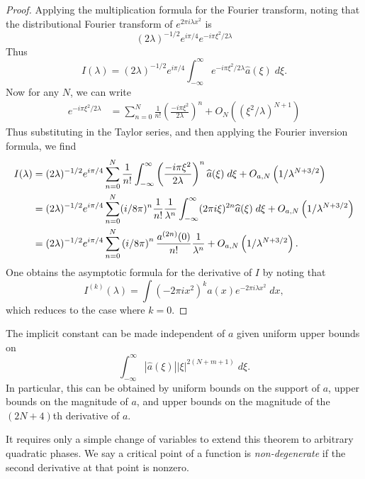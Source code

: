 \begin{proof}
  Applying the multiplication formula for the Fourier transform, noting that the distributional Fourier transform of $e^{2 \pi i \lambda x^2}$ is
  \[ (2 \lambda)^{-1/2} e^{i \pi / 4} e^{- i \pi \xi^2 / 2 \lambda} \]
  Thus
  \[ I(\lambda) = (2 \lambda)^{-1/2} e^{i \pi / 4} \int_{-\infty}^\infty e^{-i \pi \xi^2 / 2 \lambda} \widehat{a}(\xi)\; d\xi. \]
  Now for any $N$, we can write
  \begin{align*}
    e^{-i \pi \xi^2 / 2 \lambda} &= \sum_{n = 0}^N \frac{1}{n!} \left( \frac{- i \pi \xi^2}{2 \lambda} \right)^n + O_N \left( (\xi^2 / \lambda)^{N+1} \right)
  \end{align*}
  Thus substituting in the Taylor series, and then applying the Fourier inversion formula, we find
  \begin{align*}
    I(\lambda) &= (2 \lambda)^{-1/2} e^{i \pi / 4} \sum_{n = 0}^N \frac{1}{n!} \int_{-\infty}^\infty \left( \frac{-i \pi \xi^2}{2 \lambda} \right)^n \widehat{a}(\xi)\; d\xi + O_{a,N} \left( 1/\lambda^{N+3/2} \right)\\
    &= (2 \lambda)^{-1/2} e^{i \pi / 4} \sum_{n = 0}^N (i/8\pi)^n \frac{1}{n!} \frac{1}{\lambda^n} \int_{-\infty}^\infty (2\pi i \xi)^{2n} \widehat{a}(\xi)\; d\xi + O_{a,N} \left( 1 / \lambda^{N+3/2} \right)\\
    &= (2 \lambda)^{-1/2} e^{i \pi / 4} \sum_{n = 0}^N \left( i/8\pi \right)^n \frac{a^{(2n)}(0)}{n!} \frac{1}{\lambda^n} + O_{a,N} \left( 1 / \lambda^{N+3/2} \right). \qedhere
  \end{align*}
  One obtains the asymptotic formula for the derivative of $I$ by noting that
  \[ I^{(k)}(\lambda) = \int (-2 \pi i x^2)^k a(x) e^{-2 \pi i \lambda x^2}\; dx, \]
  which reduces to the case where $k = 0$.
\end{proof}

\begin{remark}
  The implicit constant can be made independent of $a$ given uniform upper bounds on
  \[ \int_{-\infty}^\infty |\widehat{a}(\xi)| |\xi|^{2(N+m+1)}\; d\xi. \]
  In particular, this can be obtained by uniform bounds on the support of $a$, upper bounds on the magnitude of $a$, and upper bounds on the magnitude of the $(2N+4)$th derivative of $a$.
\end{remark}

It requires only a simple change of variables to extend this theorem to arbitrary quadratic phases. We say a critical point of a function is \emph{non-degenerate} if the second derivative at that point is nonzero.

